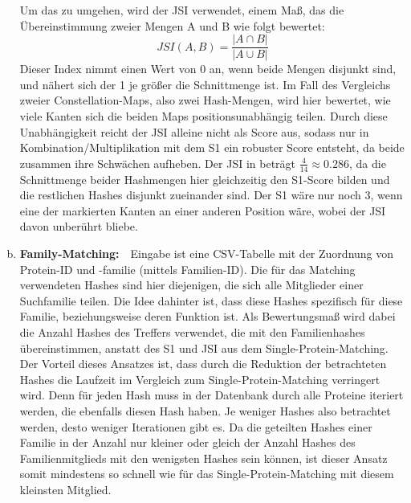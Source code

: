 \begin{enumerate}[a)]
                Um das zu umgehen, wird der \ac{JSI} verwendet, einem Maß, das die Übereinstimmung zweier Mengen A und B wie folgt bewertet:
                \begin{equation}
                    \label{equ:jsi}
                    JSI(A, B)=\frac{|A \cap B|}{|A \cup B|}
                \end{equation}
                Dieser Index nimmt einen Wert von 0 an, wenn beide Mengen disjunkt sind, und nähert sich der 1 je größer die Schnittmenge ist. Im Fall des Vergleichs zweier Constellation-Maps, also zwei Hash-Mengen, wird hier bewertet, wie viele Kanten sich die beiden Maps positionsunabhängig teilen. Durch diese Unabhängigkeit reicht der JSI alleine nicht als Score aus, sodass nur in Kombination/Multiplikation mit dem S1 ein robuster Score entsteht, da beide zusammen ihre Schwächen aufheben. Der \ac{JSI} in  beträgt $\frac{4}{14} \approx 0.286$, da die Schnittmenge beider Hashmengen hier gleichzeitig den S1-Score bilden und die restlichen Hashes disjunkt zueinander sind. Der S1 wäre nur noch 3, wenn eine der markierten Kanten an einer anderen Position wäre, wobei der \ac{JSI} davon unberührt bliebe.

            \item {}
                \textbf{Family-Matching:}\ \ Eingabe ist eine \ac{CSV}-Tabelle mit der Zuordnung von Protein-ID und -familie (mittels Familien-ID). Die für das Matching verwendeten Hashes sind hier diejenigen, die sich alle Mitglieder einer Suchfamilie teilen. Die Idee dahinter ist, dass diese Hashes spezifisch für diese Familie, beziehungsweise deren Funktion ist. Als Bewertungsmaß wird dabei die Anzahl Hashes des Treffers verwendet, die mit den Familienhashes übereinstimmen, anstatt des S1 und \ac{JSI} aus dem Single-Protein-Matching. Der Vorteil dieses Ansatzes ist, dass durch die Reduktion der betrachteten Hashes die Laufzeit im Vergleich zum Single-Protein-Matching verringert wird. Denn für jeden Hash muss in der Datenbank durch alle Proteine iteriert werden, die ebenfalls diesen Hash haben. Je weniger Hashes also betrachtet werden, desto weniger Iterationen gibt es. Da die geteilten Hashes einer Familie in der Anzahl nur kleiner oder gleich der Anzahl Hashes des Familienmitglieds mit den wenigsten Hashes sein können, ist dieser Ansatz somit mindestens so schnell wie für das Single-Protein-Matching mit diesem kleinsten Mitglied.


\end{enumerate}
